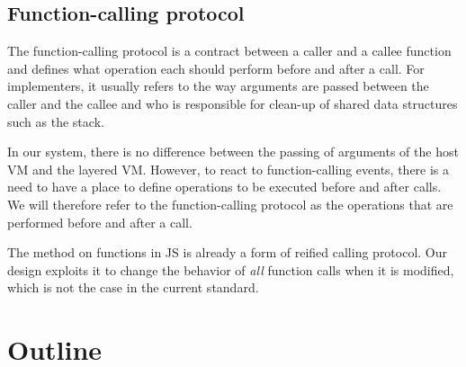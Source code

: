 \subsection{Function-calling protocol}

The function-calling protocol is a contract between a caller and a callee
function and defines what operation each should perform before and after a
call. For implementers, it usually refers to the way arguments are
passed between the caller and the callee and who is responsible for clean-up of
shared data structures such as the stack.

In our system, there is no difference between the passing of arguments of the
host VM and the layered VM. However, to react to function-calling events, there
is a need to have a place to define operations to be executed before and after
calls. We will therefore refer to the function-calling protocol as the
operations that are performed before and after a call. 

The  method on functions in JS is already a form of reified calling
protocol. Our design exploits it to change the behavior of \textit{all} function
calls when it is modified, which is not the case in the current standard.

%
%
%

\section{Outline}

